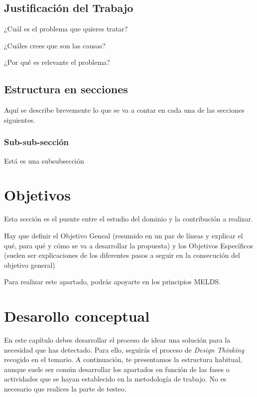 \documentclass[12pt,a4paper]{proyectoinnovacion}
\begin{document}
\subsection{Justificación del Trabajo}

¿Cuál es el problema que quieres tratar?

¿Cuáles crees que son las causas?

¿Por qué es relevante el problema?


\subsection{Estructura en secciones}

Aquí se describe brevemente lo que se va a contar en cada una de las secciones siguientes.

\subsubsection{Sub-sub-sección}

Está es una subsubsección

\section{Objetivos}

Esta sección es el puente entre el estudio del dominio y la contribución a realizar. 

Hay que definir el Objetivo Geneal (resumido en un par de líneas y explicar el qué, para qué y cómo se va a desarrollar la propuesta) y los Objetivos Específicos (suelen ser explicaciones de los diferentes pasos a seguir en la consecución del objetivo general)

Para realizar este apartado, podrás apoyarte en los principios MELDS.


\section{Desarollo conceptual}


En este capítulo debes desarrollar el proceso de idear una solución para la necesidad que has detectado. Para ello, seguirás el proceso de \textit{Design Thinking} recogido en el temario. A continuación, te presentamos la estructura habitual, aunque suele ser común desarrollar los apartados en función de las fases o actividades que se hayan establecido en la metodología de trabajo. No es necesario que realices la parte de testeo.
\end{document}
